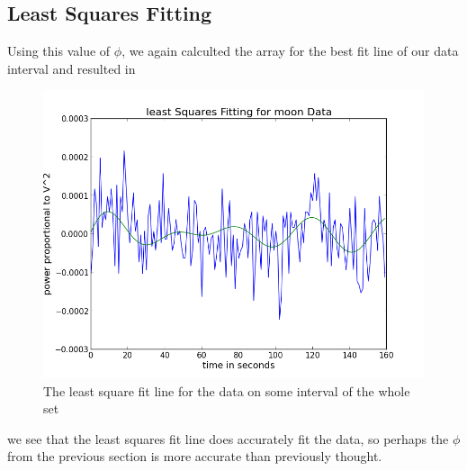 \documentclass[12 pt]{article}
\begin{document}
\subsection*{Least Squares Fitting}
Using this value of $\phi$, we again calculted the array for the best
fit line of our data interval  and resulted in 
\begin{figure}[H]
\centering
\includegraphics[scale=0.5]{moonlsqfit.png}
\caption{The least square fit line for the data on some interval of the
  whole set}
\label{moonlsqfit}
\end{figure}
we see that the least squares fit line does accurately fit the data, so
perhaps the $\phi$ from the previous section is more accurate than
previously thought.
\end{document}
